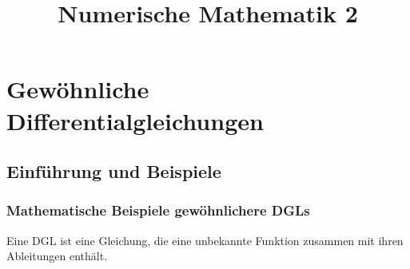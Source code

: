 \documentclass[
]{mycourse}
\title{Numerische Mathematik 2}
\author{}
\begin{document}
\maketitle
\tableofcontents

\chapter{Gewöhnliche Differentialgleichungen}


\section{Einführung und Beispiele}


\subsection{Mathematische Beispiele gewöhnlichere DGLs}

Eine DGL ist eine Gleichung, die eine unbekannte Funktion zusammen mit ihren Ableitungen enthält.
\end{document}
